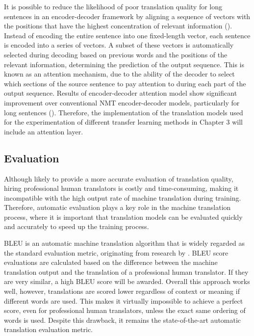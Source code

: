 It is possible to reduce the likelihood of poor translation quality for long sentences in an encoder-decoder framework by aligning a sequence of vectors with the positions that have the highest concentration of relevant information (\cite{bahdanau_neural_2016}). 
Instead of encoding the entire sentence into one fixed-length vector, each sentence is encoded into a series of vectors. A subset of these vectors is automatically selected during decoding based on previous words and the positions of the relevant information, determining the prediction of the output sequence. This is known as an attention mechanism, due to the ability of the decoder to select which sections of the source sentence to pay attention to during each part of the output sequence. Results of encoder-decoder attention model show significant improvement over conventional \acrshort{NMT} encoder-decoder models, particularly for long sentences (\cite{luong_effective_2015}). Therefore, the implementation of the translation models used for the experimentation of different transfer learning methods in Chapter 3 will include an attention layer.

\subsection{Evaluation}

Although likely to provide a more accurate evaluation of translation quality, hiring professional human translators is costly and time-consuming, making it incompatible with the high output rate of machine translation during training.
Therefore, automatic evaluation plays a key role in the machine translation process, where it is important that translation models can be evaluated quickly and accurately to speed up the training process.

\acrfull{BLEU} is an automatic machine translation algorithm that is widely regarded as the standard evaluation metric, originating from research by \cite{papineni_bleu_2001}. \acrshort{BLEU} score evaluations are calculated based on the difference between the machine translation output and the translation of a professional human translator. If they are very similar, a high \acrshort{BLEU} score will be awarded. Overall this approach works well, however, translations are scored lower regardless of context or meaning if different words are used. This makes it virtually impossible to achieve a perfect score, even for professional human translators, unless the exact same ordering of words is used. Despite this drawback, it remains the state-of-the-art automatic translation evaluation metric.

